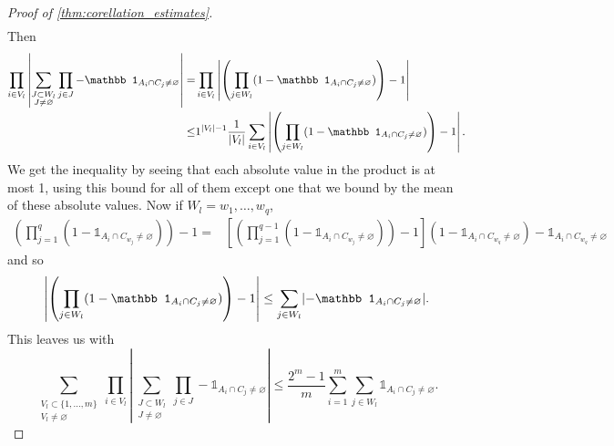 \documentclass{article}
\DeclarePairedDelimiter\abs{\lvert}{\rvert}
\begin{document}
\begin{proof}[Proof of \cref{thm:corellation_estimates}]
\begin{multline*}
        \end{multline*}
        Then 
        \begin{align*}
            \prod_{i\in V_l}\left|\sum_{\substack{J\subset W_l\\J\neq\varnothing}} \prod_{j\in J}-\mathbb 1_{A_i\cap C_j\neq\varnothing}\right|=&\prod_{i\in V_l}\left|\left(\prod_{j\in W_l}(1-\mathbb 1_{A_i\cap C_j\neq\varnothing})\right)-1\right|\\
            \leq& 1^{\abs{V_l}-1}\frac 1 {\abs{V_l}} \sum_{i\in V_l}\left|\left(\prod_{j\in W_l}(1-\mathbb 1_{A_i\cap C_j\neq\varnothing})\right)-1\right|.
        \end{align*}
        We get the inequality by seeing that each absolute value in the product is at most 1, using this bound for all of them except one that we bound by the mean of these absolute values.
        Now if $W_l=w_1,\ldots,w_q$,
        \begin{align*}
            \left(\prod_{j=1}^q(1-\mathbb 1_{A_i\cap C_{w_j}\neq\varnothing})\right)-1=&\left[\left(\prod_{j=1}^{q-1}(1-\mathbb 1_{A_i\cap C_{w_j}\neq\varnothing})\right)-1\right](1-\mathbb 1_{A_i\cap C_{w_q}\neq\varnothing})-\mathbb 1_{A_i\cap C_{w_q}\neq\varnothing}
        \end{align*}
        and so $$\left|\left(\prod_{j\in W_l}(1-\mathbb 1_{A_i\cap C_j\neq\varnothing})\right)-1\right|\leq \sum_{j\in W_l}\abs{-\mathbb 1_{A_i\cap C_{j}\neq\varnothing}}.$$
        This leaves us with $$
         \sum_{\substack{V_l\subset \{1,\ldots,m\}\\V_l\neq\varnothing}}\prod_{i\in V_l}\left|\sum_{\substack{J\subset W_l\\J\neq\varnothing}} \prod_{j\in J}-\mathbb 1_{A_i\cap C_j\neq\varnothing}\right|\leq \frac {2^m-1} m \sum_{i=1}^m\sum_{j\in W_l}\mathbb 1_{A_i\cap C_{j}\neq\varnothing}.
        $$
        

\end{proof}
\end{document}
